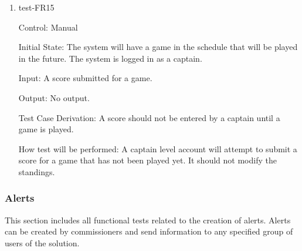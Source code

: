 \documentclass[12pt, titlepage]{article}
\begin{document}
\begin{enumerate}

  \item{test-FR15\\}

  Control: Manual

  Initial State: The system will have a game in the schedule that will be played
  in the future. The system is logged in as a captain.

  Input: A score submitted for a game.

  Output: No output.

  Test Case Derivation: A score should not be entered by a captain until a game
  is played.

  How test will be performed: A captain level account will attempt to submit a
  score for a game that has not been played yet. It should not modify the
  standings.

\end{enumerate}

\subsubsection{Alerts}

This section includes all functional tests related to the creation of alerts.
Alerts can be created by commissioners and send information to any specified
group of users of the solution.
\end{document}
